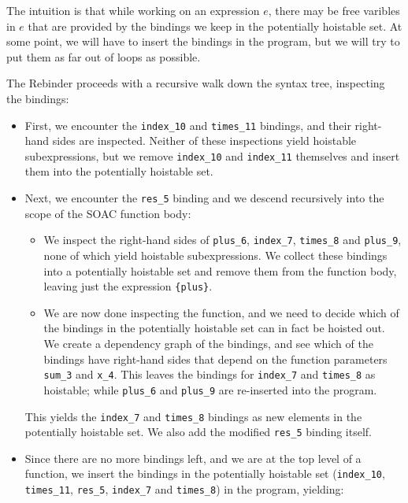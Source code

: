 The intuition is that while working on an expression $e$, there may be
free varibles in $e$ that are provided by the bindings we keep in the
potentially hoistable set.  At some point, we will have to insert the
bindings in the program, but we will try to put them as far out of
loops as possible.

The Rebinder proceeds with a recursive walk down the syntax tree,
inspecting the bindings:
\begin{itemize}
\item First, we encounter the \texttt{index\_10} and
  \texttt{times\_11} bindings, and their right-hand sides are
  inspected.  Neither of these inspections yield hoistable
  subexpressions, but we remove \texttt{index\_10} and
  \texttt{index\_11} themselves and insert them into the potentially
  hoistable set.

\item Next, we encounter the \texttt{res\_5} binding and we descend
  recursively into the scope of the SOAC function body:

  \begin{itemize}
  \item We inspect the right-hand sides of \texttt{plus\_6},
    \texttt{index\_7}, \texttt{times\_8} and \texttt{plus\_9}, none of
    which yield hoistable subexpressions.  We collect these bindings
    into a potentially hoistable set and remove them from the function
    body, leaving just the expression \texttt{\{plus\}}.

  \item We are now done inspecting the function, and we need to decide
    which of the bindings in the potentially hoistable set can in fact
    be hoisted out.  We create a dependency graph of the
    bindings, and see which of the bindings have
    right-hand sides that depend on the function parameters
    \texttt{sum\_3} and \texttt{x\_4}.  This leaves the bindings for
    \texttt{index\_7} and \texttt{times\_8} as hoistable; while
    \texttt{plus\_6} and \texttt{plus\_9} are re-inserted into the
    program.
  \end{itemize}

  This yields the \texttt{index\_7} and \texttt{times\_8} bindings as
  new elements in the potentially hoistable set.  We also add the
  modified \texttt{res\_5} binding itself.

\item Since there are no more bindings left, and we are at the top
  level of a function, we insert the bindings in the potentially
  hoistable set (\texttt{index\_10}, \texttt{times\_11},
  \texttt{res\_5}, \texttt{index\_7} and \texttt{times\_8}) in the
  program, yielding:


\end{itemize}
